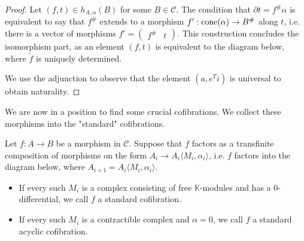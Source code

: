 \documentclass[../thesis.tex]{subfiles}
\begin{document}
            \begin{proof}
                Let $(f,t)\in h_{A,\alpha}(B)$ for some $B\in\mathcal{C}$. The condition that $\partial t = f^\#\alpha$ is equivalent to say that $f^\#$ extends to a morphism $f' : \tt{cone}(\alpha) \rightarrow B^\#$ along $t$, i.e. there is a vector of morphisms $f' = \begin{pmatrix}f^\# & t\end{pmatrix}$. This construction concludes the isomorphism part, as an element $(f,t)$ is equivalent to the diagram below, where $\widetilde{f}$ is uniquely determined.
                \begin{center}
                \end{center}
  
                We use the adjunction to observe that the element $(a, e^Ti)$ is universal to obtain naturality.
            \end{proof}

            We are now in a position to find some crucial cofibrations. We collect these morphisms into the "standard" cofibrations.

            \begin{definition}
                Let $f:A\rightarrow B$ be a morphism in $\mathcal{C}$. Suppose that $f$ factors as a transfinite composition of morphisms on the form $A_i \rightarrow A_i\langle M_i,\alpha_i\rangle$, i.e. $f$ factors into the diagram below, where $A_{i+1} = A_i\langle M_i,\alpha_i\rangle$.
                \begin{center}
                \end{center}
                \begin{itemize}
                    \item If every such $M_i$ is a complex consisting of free $\mathbb{K}$-modules and has a $0$-differential, we call $f$ a standard cofibration.
                    \item If every such $M_i$ is a contractible complex and $\alpha = 0$, we call $f$ a standard acyclic cofibration.
                \end{itemize}
            \end{definition}
\end{document}
